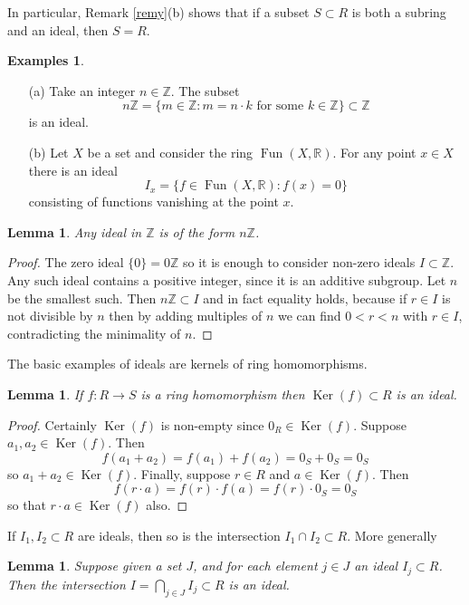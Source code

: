 \documentclass [12pt,oneside,a4paper,mathscr]{amsart}
\newtheorem{lemma}[thm]{Lemma}
\theoremstyle{definition}
\newtheorem{examples}[thm]{Examples}
\newcommand{\R}{\mathbb{R}}
\newcommand{\Z}{\mathbb Z}
\newcommand{\Fun}{\operatorname{Fun}}
\renewcommand{\ker}{\operatorname{Ker}}
\begin{document}
In particular, Remark \ref{remy}(b) shows that  if a subset $S\subset R$ is both a subring and an ideal, then $S=R$.

\begin{examples}
\begin{itemize}
\item[(a)] Take an integer $n\in \Z$. The subset \[n\Z = \{m\in \Z: m=n\cdot k \text{ for some } k\in \Z\}\subset \Z\] is an ideal. \smallskip

\item[(b)] Let $X$ be a set and consider the ring $\Fun(X,\R)$. For any point $x\in X$ there is an ideal
\[I_x = \{f\in \Fun(X,\R): f(x)=0\}\]
consisting of functions vanishing at the point $x$.
\end{itemize}
\end{examples}

\begin{lemma}
\label{nz}
 Any ideal in $\Z$ is of the form $n\Z$. 
\end{lemma}

\begin{proof}The zero ideal $\{0\}=0\Z$ so it is enough to consider non-zero ideals $I\subset \Z$. Any such ideal contains a positive integer, since it is an additive subgroup. Let $n$ be the smallest such. Then $n\Z\subset I$ and in fact equality holds, because if $r\in I$ is not divisible by $n$  then by adding multiples of $n$ we can find $0<r<n$ with $r\in I$, contradicting the minimality of $n$. \end{proof}

The basic examples of ideals are kernels of ring homomorphisms.

\begin{lemma}
If $f\colon R \to S$ is a ring homomorphism then $\ker(f)\subset R$ is an ideal.
\end{lemma}

\begin{proof}
Certainly $\ker(f)$ is non-empty since $0_R\in \ker(f)$. Suppose $a_1,a_2\in \ker(f)$. Then \[f(a_1+a_2)=f(a_1)+f(a_2)=0_S+0_S=0_S\] so $a_1+a_2\in \ker(f)$. Finally, suppose $r\in R$ and $a\in \ker(f)$. Then \[f(r\cdot a)=f(r)\cdot f(a)=f(r)\cdot 0_S=0_S\] 
so that $r\cdot a\in \ker(f)$ also.
\end{proof}


If $I_1,I_2 \subset R$ are ideals, then so is the intersection $I_1\cap I_2\subset R$. More generally

\begin{lemma}
\label{in}
Suppose given a set $J$, and for each element $j\in J$ an ideal $I_j\subset R$. Then the  intersection $I=\bigcap_{j\in J} I_j\subset R$ is an ideal.
\end{lemma}
\end{document}
